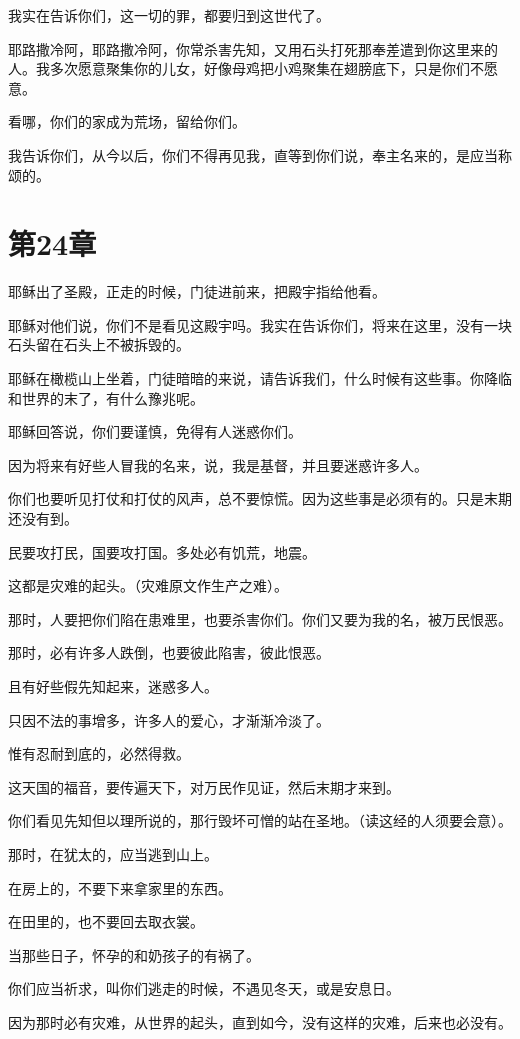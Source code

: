 \documentclass[12pt,oneside]{book}
\begin{document}
我实在告诉你们，这一切的罪，都要归到这世代了。

耶路撒冷阿，耶路撒冷阿，你常杀害先知，又用石头打死那奉差遣到你这里来的人。我多次愿意聚集你的儿女，好像母鸡把小鸡聚集在翅膀底下，只是你们不愿意。

看哪，你们的家成为荒场，留给你们。

我告诉你们，从今以后，你们不得再见我，直等到你们说，奉主名来的，是应当称颂的。

\chapter{第24章}
耶稣出了圣殿，正走的时候，门徒进前来，把殿宇指给他看。

耶稣对他们说，你们不是看见这殿宇吗。我实在告诉你们，将来在这里，没有一块石头留在石头上不被拆毁的。

耶稣在橄榄山上坐着，门徒暗暗的来说，请告诉我们，什么时候有这些事。你降临和世界的末了，有什么豫兆呢。

耶稣回答说，你们要谨慎，免得有人迷惑你们。

因为将来有好些人冒我的名来，说，我是基督，并且要迷惑许多人。

你们也要听见打仗和打仗的风声，总不要惊慌。因为这些事是必须有的。只是末期还没有到。

民要攻打民，国要攻打国。多处必有饥荒，地震。

这都是灾难的起头。（灾难原文作生产之难）。

那时，人要把你们陷在患难里，也要杀害你们。你们又要为我的名，被万民恨恶。

那时，必有许多人跌倒，也要彼此陷害，彼此恨恶。

且有好些假先知起来，迷惑多人。

只因不法的事增多，许多人的爱心，才渐渐冷淡了。

惟有忍耐到底的，必然得救。

这天国的福音，要传遍天下，对万民作见证，然后末期才来到。

你们看见先知但以理所说的，那行毁坏可憎的站在圣地。（读这经的人须要会意）。

那时，在犹太的，应当逃到山上。

在房上的，不要下来拿家里的东西。

在田里的，也不要回去取衣裳。

当那些日子，怀孕的和奶孩子的有祸了。

你们应当祈求，叫你们逃走的时候，不遇见冬天，或是安息日。

因为那时必有灾难，从世界的起头，直到如今，没有这样的灾难，后来也必没有。
\end{document}
